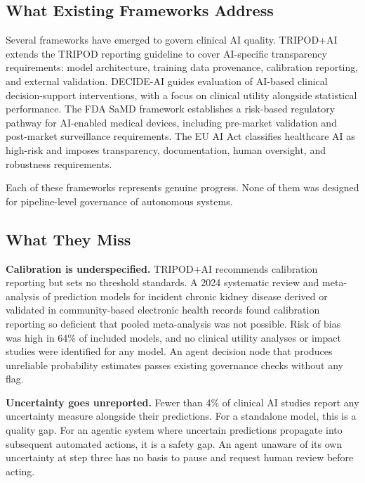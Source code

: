 \documentclass[12pt,a4paper]{article}
\begin{document}
\subsection*{What Existing Frameworks Address}

Several frameworks have emerged to govern clinical AI quality.
TRIPOD+AI\cite{collins2024tripod} extends the TRIPOD reporting
guideline to cover AI-specific transparency requirements: model
architecture, training data provenance, calibration reporting, and
external validation. DECIDE-AI\cite{vasey2022} guides evaluation
of AI-based clinical decision-support interventions, with a focus
on clinical utility alongside statistical performance. The FDA
SaMD framework\cite{fda2021} establishes a risk-based regulatory
pathway for AI-enabled medical devices, including pre-market
validation and post-market surveillance requirements. The EU AI
Act\cite{euaiact2024} classifies healthcare AI as high-risk and
imposes transparency, documentation, human oversight, and
robustness requirements.

Each of these frameworks represents genuine progress. None of
them was designed for pipeline-level governance of autonomous
systems.

\subsection*{What They Miss}

\textbf{Calibration is underspecified.}
TRIPOD+AI recommends calibration reporting but sets no threshold
standards. A 2024 systematic review and meta-analysis of
prediction models for incident chronic kidney disease derived or
validated in community-based electronic health records found
calibration reporting so deficient that pooled meta-analysis was
not possible. Risk of bias was high in 64\% of included models,
and no clinical utility analyses or impact studies were identified
for any model.\cite{haris2024} An agent decision node that
produces unreliable probability estimates passes existing
governance checks without any flag.

\textbf{Uncertainty goes unreported.}
Fewer than 4\% of clinical AI studies report any uncertainty
measure alongside their predictions.\cite{prinzi2025} For a
standalone model, this is a quality gap. For an agentic system
where uncertain predictions propagate into subsequent automated
actions, it is a safety gap. An agent unaware of its own
uncertainty at step three has no basis to pause and request human
review before acting.
\end{document}
